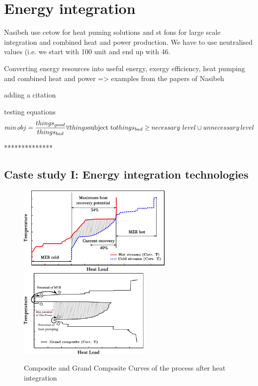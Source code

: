 \section{Energy integration}


Nasibeh use cetow for heat puming solutions and st fons for large scale integration and combined heat and power production. We have to use neutralised values (i.e. we start with 100 unit and end up with 46.


Converting energy resources into useful energy, exergy efficiency, heat pumping and combined heat and power => examples from the papers of Nasibeh

adding a citation \cite{Pouransari_2014}

testing equations
\begin{equation}
min \, obj= \frac{things_{good}}{things_{bad}} \forall things\\
\text{subject to}  \\
things_{bad}\ge necessary\,\, level \cup unnecessary \, level
\end{equation}

**************

\subsection{Caste study I: Energy integration technologies}

\begin{figure}[h]
        \begin{center}
        \includegraphics [width=75mm]{figures/EnergyIntegration/figMERcc.pdf} 
        \includegraphics [height=4.3cm]{figures/EnergyIntegration/figMERgcc.pdf}
        \caption{Composite and Grand Composite Curves of the process after heat integration}
        \label{fig1:mer}
        \end{center}
        \end{figure}
        
